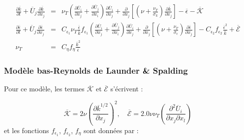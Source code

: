 \begin{subequations}

\begin{eqnarray}
\frac{\partial\overline{k}}{\partial t}+\overline{U}_{j}\frac{\partial\overline{k}}{\partial x_{j}} & = & \nu_{T}\left(\frac{\partial\overline{U}_{i}}{\partial x_{j}}+\frac{\partial\overline{U}_{j}}{\partial x_{i}}\right)\frac{\partial\overline{U}_{i}}{\partial x_{j}}+\frac{\partial}{\partial x_{j}}\left[\left(\nu+\frac{\nu_{T}}{\sigma_{k}}\right)\frac{\partial\overline{k}}{\partial x_{j}}\right]-\overline{\epsilon}-\overline{\mathcal{K}}\label{eq:EnerCinTurb_k_LowRe}\\
\frac{\partial\overline{\epsilon}}{\partial t}+\overline{U}_{j}\frac{\partial\overline{\epsilon}}{\partial x_{j}} & = & C_{\epsilon_{1}}\nu_{T}\frac{\overline{\epsilon}}{\overline{k}}f_{\epsilon_{1}}\left(\frac{\partial\overline{U}_{i}}{\partial x_{j}}+\frac{\partial\overline{U}_{j}}{\partial x_{i}}\right)\frac{\partial\overline{U}_{i}}{\partial x_{j}}+\frac{\partial}{\partial x_{j}}\left[\left(\nu+\frac{\nu_{T}}{\sigma_{\epsilon}}\right)\frac{\partial\overline{\epsilon}}{\partial x_{j}}\right]-C_{\epsilon_{2}}f_{\epsilon_{2}}\frac{\overline{\epsilon}^{2}}{\overline{k}}+\overline{\mathcal{E}}\label{eq:TauxDissip_eps_LowRe}\\
\nu_{T} & = & C_{\eta}f_{\eta}\frac{\overline{k}^{2}}{\overline{\epsilon}}\label{eq:Nu_T_LowRe}
\end{eqnarray}


\end{subequations}


\subsubsection*{Mod\`ele \og bas-Reynolds \fg{} de Launder \& Spalding \cite{Launder-Spalding_NumCompTurbFlow1974}}

Pour ce mod\`ele, les termes $\overline{\mathcal{K}}$ et $\overline{\mathcal{E}}$
s'\'ecrivent \cite[Eqs. (2.3-4) et (2.3-5)]{Launder-Spalding_NumCompTurbFlow1974}
:

\begin{equation}
\overline{\mathcal{K}}=2\nu\left(\frac{\partial\overline{k}^{1/2}}{\partial x_{j}}\right)^{2},\quad\overline{\mathcal{E}}=2.0\nu\nu_{T}\left(\frac{\partial^{2}\overline{U}_{i}}{\partial x_{j}\partial x_{l}}\right)\label{eq:K-E_Model1}
\end{equation}
et les fonctions $f_{\epsilon_{1}}$, $f_{\epsilon_{2}}$, $f_{\eta}$
sont donn\'ees par \cite[Eqs. (2.3-6) et (2.3-7)]{Launder-Spalding_NumCompTurbFlow1974}
:

